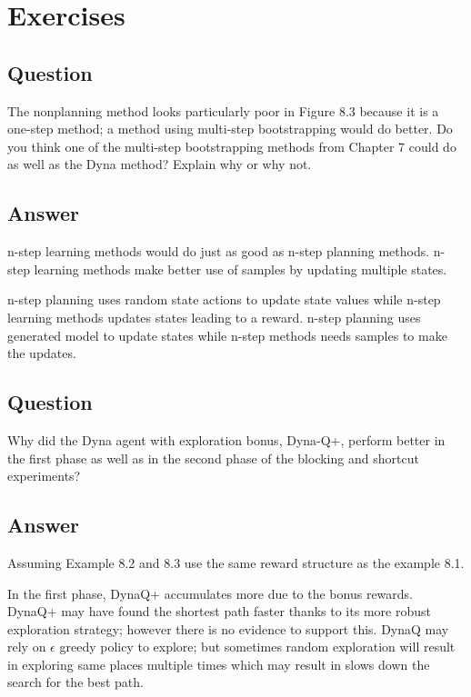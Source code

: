 \documentclass[11pt]{article}
\begin{document}
    \maketitle
    \setcounter{section}{6}


    \section{Exercises}

    \subsection{Question}

    The nonplanning method looks particularly poor in Figure 8.3 because it is a one-step method;
    a method using multi-step bootstrapping would do better.
    Do you think one of the multi-step bootstrapping methods from Chapter 7 could do as well as  the Dyna method?
    Explain why or why not.

    \subsection*{Answer}

    n-step learning methods would do just as good as n-step planning methods.
    n-step learning methods make better use of samples by updating multiple states.

    n-step planning uses random state actions to update state values while n-step learning methods updates states leading to a reward.
    n-step planning uses generated model to update states while n-step methods needs samples to make the updates.

    \subsection{Question}

    Why did the Dyna agent with exploration bonus, Dyna-Q+, perform better in the first phase as well as in the second phase of the blocking and shortcut experiments?

    \subsection*{Answer}

    Assuming Example 8.2 and 8.3 use the same reward structure as the example 8.1.

    In the first phase, DynaQ+ accumulates more due to the bonus rewards.
    DynaQ+ may have found the shortest path faster thanks to its more robust exploration strategy;
    however there is no evidence to support this.
    DynaQ may rely on $\epsilon$ greedy policy to explore;
    but sometimes random exploration will result in exploring same places multiple times which may result in slows down the search for the best path.
\end{document}
